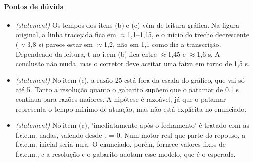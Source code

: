 \documentclass{article}%
\begin{document}
\paragraph{Pontos de dúvida}%
\begin{itemize}%
\item%
\textit{(statement)} Os tempos dos itens (b) e (c) vêm de leitura gráfica. Na figura original, a linha tracejada fica em $\approx$1,1--1,15, e o início do trecho decrescente ($\approx$3,8 s) parece estar em $\approx$1,2, não em 1,1 como diz a transcrição. Dependendo da leitura, t no item (b) fica entre $\approx$1,45 e $\approx$1,6 s. A conclusão não muda, mas o corretor deve aceitar uma faixa em torno de 1,5 s.%
\item%
\textit{(statement)} No item (c), a razão 25 está fora da escala do gráfico, que vai só até 5. Tanto a resolução quanto o gabarito supõem que o patamar de 0,1 s continua para razões maiores. A hipótese é razoável, já que o patamar representa o tempo mínimo de atuação, mas não está explícita no enunciado.%
\item%
\textit{(statement)} No item (a), 'imediatamente após o fechamento' é tratado com as f.c.e.m. dadas, valendo desde t = 0. Num motor real que parte do repouso, a f.c.e.m. inicial seria nula. O enunciado, porém, fornece valores fixos de f.c.e.m., e a resolução e o gabarito adotam esse modelo, que é o esperado.%
\end{itemize}%
\end{document}
